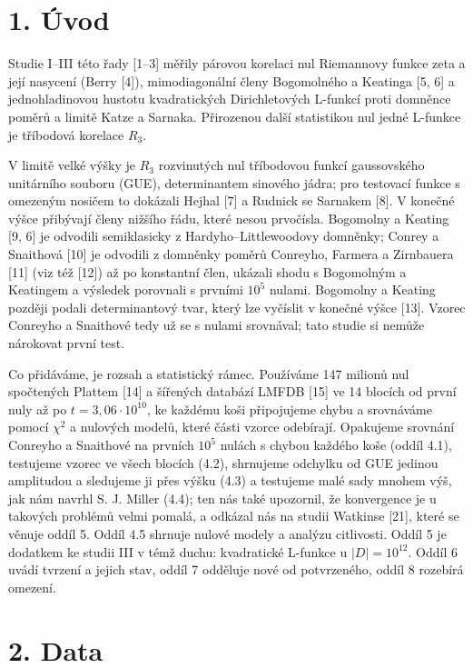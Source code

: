\documentclass[
  10pt,
]{article}
\begin{document}
\hypertarget{uxfavod}{%
\section{1. Úvod}\label{uxfavod}}

Studie I--III této řady {[}1--3{]} měřily párovou korelaci nul
Riemannovy funkce zeta a její nasycení (Berry {[}4{]}), mimodiagonální
členy Bogomolného a Keatinga {[}5, 6{]} a jednohladinovou hustotu
kvadratických Dirichletových L-funkcí proti domněnce poměrů a limitě
Katze a Sarnaka. Přirozenou další statistikou nul jedné L-funkce je
tříbodová korelace \(R_3\).

V limitě velké výšky je \(R_3\) rozvinutých nul tříbodovou funkcí
gaussovského unitárního souboru (GUE), determinantem sinového jádra; pro
testovací funkce s omezeným nosičem to dokázali Hejhal {[}7{]} a Rudnick
se Sarnakem {[}8{]}. V konečné výšce přibývají členy nižšího řádu, které
nesou prvočísla. Bogomolny a Keating {[}9, 6{]} je odvodili semiklasicky
z Hardyho--Littlewoodovy domněnky; Conrey a Snaithová {[}10{]} je
odvodili z domněnky poměrů Conreyho, Farmera a Zirnbauera {[}11{]} (viz
též {[}12{]}) až po konstantní člen, ukázali shodu s Bogomolným a
Keatingem a výsledek porovnali s prvními \(10^5\) nulami. Bogomolny a
Keating později podali determinantový tvar, který lze vyčíslit v konečné
výšce {[}13{]}. Vzorec Conreyho a Snaithové tedy už se s nulami
srovnával; tato studie si nemůže nárokovat první test.

Co přidáváme, je rozsah a statistický rámec. Používáme 147 milionů nul
spočtených Plattem {[}14{]} a šířených databází LMFDB {[}15{]} ve 14
blocích od první nuly až po \(t = 3{,}06\cdot10^{10}\), ke každému koši
připojujeme chybu a srovnáváme pomocí \(\chi^2\) a nulových modelů,
které části vzorce odebírají. Opakujeme srovnání Conreyho a Snaithové na
prvních \(10^5\) nulách s chybou každého koše (oddíl 4.1), testujeme
vzorec ve všech blocích (4.2), shrnujeme odchylku od GUE jedinou
amplitudou a sledujeme ji přes výšku (4.3) a testujeme malé sady mnohem
výš, jak nám navrhl S. J. Miller (4.4); ten nás také upozornil, že
konvergence je u takových problémů velmi pomalá, a odkázal nás na studii
Watkinse {[}21{]}, které se věnuje oddíl 5. Oddíl 4.5 shrnuje nulové
modely a analýzu citlivosti. Oddíl 5 je dodatkem ke studii III v témž
duchu: kvadratické L-funkce u \(|D| = 10^{12}\). Oddíl 6 uvádí tvrzení a
jejich stav, oddíl 7 odděluje nové od potvrzeného, oddíl 8 rozebírá
omezení.

\hypertarget{data}{%
\section{2. Data}\label{data}}
\end{document}
